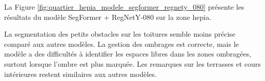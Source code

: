 
\newpage
La Figure \ref{fig:quartier_hepia_modele_segformer_regnety_080} présente les résultats du modèle SegFormer + RegNetY-080 sur la zone \acrshort{hepia}.

La segmentation des petits obstacles sur les toitures semble moins précise comparé aux autres modèles. La gestion des ombrages est correcte, mais le modèle a des difficultés à identifier les espaces libres dans les zones ombragées, surtout lorsque l'ombre est plus marquée. Les remarques sur les terrasses et cours intérieures restent similaires aux autres modèles.

\begin{figure}[H]
\centering
{}
\end{figure}
